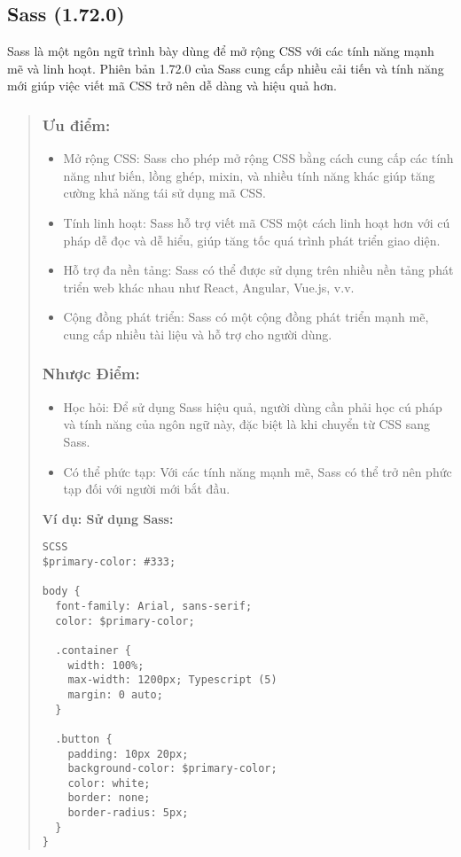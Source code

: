 \subsection{Sass (1.72.0)}

Sass là một ngôn ngữ trình bày dùng để mở rộng CSS với các tính năng mạnh mẽ và linh hoạt. Phiên bản 1.72.0 của Sass cung cấp nhiều cải tiến và tính năng mới giúp việc viết mã CSS trở nên dễ dàng và hiệu quả hơn.

\begin{quote}
\subsubsection{Ưu điểm:}
\begin{itemize}
  \item Mở rộng CSS: Sass cho phép mở rộng CSS bằng cách cung cấp các tính năng như biến, lồng ghép, mixin, và nhiều tính năng khác giúp tăng cường khả năng tái sử dụng mã CSS.
  \item Tính linh hoạt: Sass hỗ trợ viết mã CSS một cách linh hoạt hơn với cú pháp dễ đọc và dễ hiểu, giúp tăng tốc quá trình phát triển giao diện.
  \item Hỗ trợ đa nền tảng: Sass có thể được sử dụng trên nhiều nền tảng phát triển web khác nhau như React, Angular, Vue.js, v.v.
  \item Cộng đồng phát triển: Sass có một cộng đồng phát triển mạnh mẽ, cung cấp nhiều tài liệu và hỗ trợ cho người dùng.
\end{itemize}

\subsubsection{Nhược Điểm:}
\begin{itemize}
  \item Học hỏi: Để sử dụng Sass hiệu quả, người dùng cần phải học cú pháp và tính năng của ngôn ngữ này, đặc biệt là khi chuyển từ CSS sang Sass.
  \item Có thể phức tạp: Với các tính năng mạnh mẽ, Sass có thể trở nên phức tạp đối với người mới bắt đầu.
\end{itemize}

\textbf{Ví dụ: Sử dụng Sass:}
\begin{lstlisting}
SCSS
$primary-color: #333;

body {
  font-family: Arial, sans-serif;
  color: $primary-color;

  .container {
    width: 100%;
    max-width: 1200px; Typescript (5)
    margin: 0 auto;
  }

  .button {
    padding: 10px 20px;
    background-color: $primary-color;
    color: white;
    border: none;
    border-radius: 5px;
  }
}
\end{lstlisting}
\end{quote}



